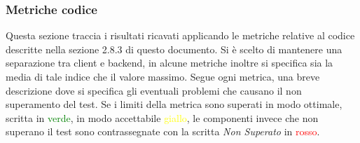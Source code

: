 		\subsubsection{Metriche codice}
			Questa sezione traccia i risultati ricavati applicando le metriche relative al codice descritte nella sezione 2.8.3 di questo documento. Si è scelto di mantenere una separazione tra client e backend, in alcune metriche inoltre si specifica sia la media di tale indice che il valore massimo. Segue ogni metrica, una breve descrizione dove si specifica gli eventuali problemi che causano il non superamento del test. Se i limiti della metrica sono superati in modo ottimale, scritta in \textcolor{green}{verde}, in modo accettabile \textcolor{yellow}{giallo}, le componenti invece che non superano il test sono contrassegnate con la scritta \textit{Non Superato} in \textcolor{red}{rosso}.\\
